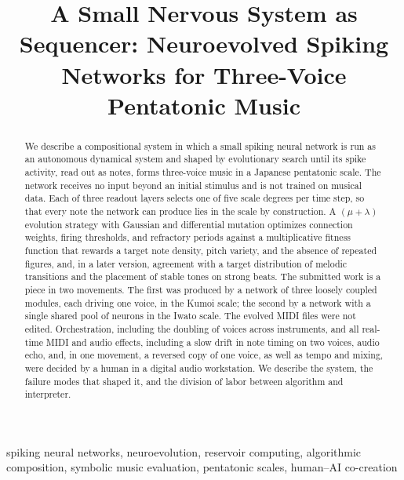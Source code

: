\documentclass[conference]{IEEEtran}
\begin{document}
\title{A Small Nervous System as Sequencer: Neuroevolved Spiking Networks for Three-Voice Pentatonic Music}

\author{
}

\maketitle

\begin{abstract}
We describe a compositional system in which a small spiking neural network is run as an autonomous dynamical system and shaped by evolutionary search until its spike activity, read out as notes, forms three-voice music in a Japanese pentatonic scale. The network receives no input beyond an initial stimulus and is not trained on musical data. Each of three readout layers selects one of five scale degrees per time step, so that every note the network can produce lies in the scale by construction. A $(\mu+\lambda)$ evolution strategy with Gaussian and differential mutation optimizes connection weights, firing thresholds, and refractory periods against a multiplicative fitness function that rewards a target note density, pitch variety, and the absence of repeated figures, and, in a later version, agreement with a target distribution of melodic transitions and the placement of stable tones on strong beats. The submitted work is a piece in two movements. The first was produced by a network of three loosely coupled modules, each driving one voice, in the Kumoi scale; the second by a network with a single shared pool of neurons in the Iwato scale. The evolved MIDI files were not edited. Orchestration, including the doubling of voices across instruments, and all real-time MIDI and audio effects, including a slow drift in note timing on two voices, audio echo, and, in one movement, a reversed copy of one voice, as well as tempo and mixing, were decided by a human in a digital audio workstation. We describe the system, the failure modes that shaped it, and the division of labor between algorithm and interpreter.
\end{abstract}

\begin{IEEEkeywords}
spiking neural networks, neuroevolution, reservoir computing, algorithmic composition, symbolic music evaluation, pentatonic scales, human--AI co-creation
\end{IEEEkeywords}
\end{document}
